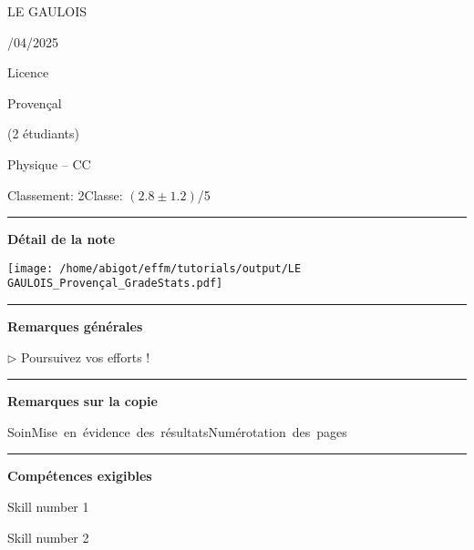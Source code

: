 \documentclass[12pt, a4paper]{article}
\begin{document}
\pagestyle{empty}
\noindent\begin{minipage}[c]{0.31\linewidth}\noindent LE GAULOIS\end{minipage}\hfill
\begin{minipage}[c]{0.31\linewidth}/04/2025 \end{minipage}\hfill
\begin{minipage}[c]{0.31\linewidth}\hfill Licence \end{minipage}\hfill

\noindent\begin{minipage}[c]{0.31\linewidth}\noindent Provençal\end{minipage}\hfill
\begin{minipage}[c]{0.31\linewidth}\hfill(2 étudiants)\end{minipage}
\begin{center} Physique -- CC\bigskip

{\Large\bf {}}\end{center}

\vspace*{-0.7cm}\noindent Classement: 2\hfill Classe:  $\left(2.8 \pm 1.2\right)$/5
\noindent\rule{\linewidth}{.7pt}\begin{center}{\large\bf Détail de la note}\end{center}

\begin{center}
\texttt{[image: /home/abigot/effm/tutorials/output/LE GAULOIS\_Provençal\_GradeStats.pdf]}\end{center}


\noindent\rule{\linewidth}{.7pt}\begin{center}{\large\bf Remarques générales}\end{center}

$\triangleright$\xspace Poursuivez vos efforts !


\noindent\rule{\linewidth}{.7pt}\begin{center}{\large\bf Remarques sur la copie}\end{center}

\begin{center}
\noindent \mbox{Soin\xspace\xspace\color{DarkOrange}\faMehO\color{black}}\hfill \mbox{Mise en évidence des résultats\xspace\xspace\color{DarkRed}\faFrownO\color{black}}\hfill \mbox{Numérotation des pages\xspace\xspace\color{DarkGreen}\faSmileO\color{black}}\hfill 
\end{center}


\noindent\rule{\linewidth}{.7pt}\begin{center}{\large\bf Compétences exigibles}\end{center}

\begin{minipage}[c]{0.4\linewidth}\centering
Skill number 1\xspace\xspace\color{DarkRed}\faFrownO\color{black}
\end{minipage}\hfill
\begin{minipage}[c]{0.4\linewidth}\centering
Skill number 2\xspace\xspace\color{DarkRed}\faFrownO\color{black}
\end{minipage}
\end{document}
